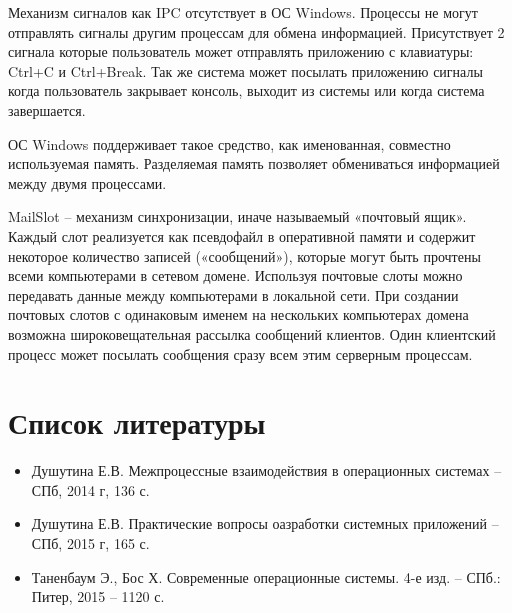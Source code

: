 \documentclass[a4paper]{article}
\begin{document}
	Механизм сигналов как IPC отсутствует в ОС Windows. Процессы не могут отправлять сигналы другим процессам для обмена информацией. Присутствует 2 сигнала которые пользователь может отправлять приложению с клавиатуры: Ctrl+C и Ctrl+Break. Так же система может посылать приложению сигналы когда пользователь закрывает консоль, выходит из системы или когда система завершается.
	
	ОС Windows поддерживает такое средство, как именованная, совместно используемая память. Разделяемая память позволяет обмениваться информацией между двумя процессами.
	
	MailSlot – механизм синхронизации, иначе называемый «почтовый ящик». Каждый слот реализуется как псевдофайл в оперативной памяти и содержит некоторое количество записей («сообщений»), которые могут быть прочтены всеми компьютерами в сетевом домене. Используя почтовые слоты можно передавать данные между компьютерами в локальной сети. При создании почтовых слотов с одинаковым именем на нескольких компьютерах домена возможна широковещательная рассылка сообщений клиентов. Один клиентский процесс может посылать сообщения сразу всем этим серверным процессам.

\section{Список литературы}
\begin{itemize}
\item Душутина Е.В.  Межпроцессные взаимодействия в операционных системах – СПб, 2014 г, 136 с.
\item Душутина Е.В.  Практические вопросы оазработки системных приложений – СПб, 2015 г, 165 с.
\item Таненбаум Э., Бос Х. Современные операционные системы. 4-е изд. – СПб.: Питер, 2015 – 1120 с.
\end{itemize}
	
\end{document}
